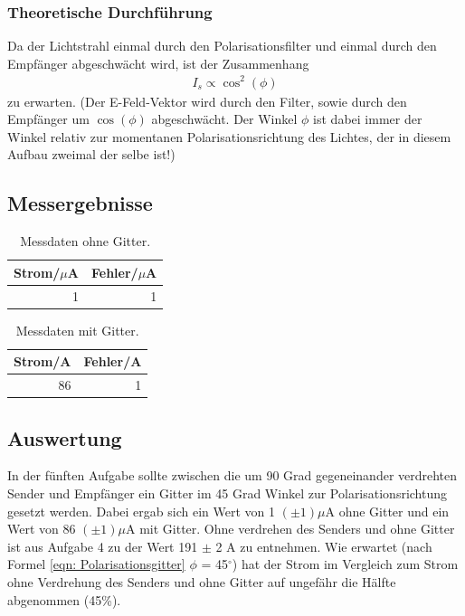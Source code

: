 \documentclass[12pt]{scrartcl}
\begin{document}
\subsubsection{Theoretische Durchführung}
Da der Lichtstrahl einmal durch den Polarisationsfilter und einmal durch den Empfänger abgeschwächt wird, ist der Zusammenhang
\begin{align}
I_s \propto \cos^2(\phi)
\label{eqn: Polarisationsgitter}
\end{align}
zu erwarten. (Der E-Feld-Vektor wird durch den Filter, sowie durch den Empfänger um $\cos(\phi)$ abgeschwächt. Der Winkel $\phi$ ist dabei immer der Winkel relativ zur momentanen Polarisationsrichtung des Lichtes, der in diesem Aufbau zweimal der selbe ist!)
\subsection{Messergebnisse}
\begin{table}[H]
\caption{Messdaten ohne Gitter.}
\centering
\begin{tabular}{|l|l|}
\hline
Strom/$\mu$A & Fehler/$\mu$A \\ \hline
\multicolumn{1}{|r|}{1} & \multicolumn{1}{r|}{1} \\ \hline
\end{tabular}
\label{tab:a_5_o}
\end{table}

\begin{table}[H]
\caption{Messdaten mit Gitter.}
\centering
\begin{tabular}{|l|l|}
\hline
Strom/A & Fehler/A \\ \hline
\multicolumn{1}{|r|}{86} & \multicolumn{1}{r|}{1} \\ \hline
\end{tabular}
\label{tab:a_5_m}
\end{table}
\subsection{Auswertung}
In der fünften Aufgabe sollte zwischen die um 90 Grad gegeneinander verdrehten Sender und Empfänger ein Gitter im 45 Grad Winkel zur Polarisationsrichtung gesetzt werden. Dabei ergab sich ein Wert von 1 $(\pm 1) \mu$A ohne Gitter und ein Wert von 86 $(\pm 1) \mu$A mit Gitter. Ohne verdrehen des Senders und ohne Gitter ist aus Aufgabe 4 zu der Wert 191 $\pm$ 2 A zu entnehmen. Wie erwartet (nach Formel \ref{eqn: Polarisationsgitter} $\phi$ = 45$^{\circ}$) hat der Strom im Vergleich zum Strom ohne Verdrehung des Senders und ohne Gitter auf ungefähr die Hälfte abgenommen (45\%).
\end{document}
